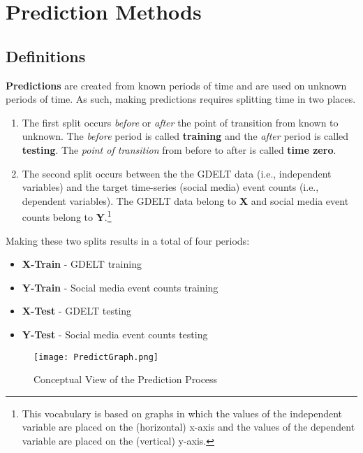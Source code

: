 
\chapter{Prediction Methods} \label{chap:PredictionMethods}

\section{Definitions}

\textbf{Predictions} are created from known periods of time and are used on unknown periods of time. 
As such, making predictions requires splitting time in two places. 

\begin{enumerate} 
  \item The first split occurs \emph{before} or \emph{after} the point of transition from known to unknown.  The \textit{before} period is called \textbf{training} and the \textit{after} period is called \textbf{testing}. The \textit{point of transition} from before to after is called \textbf{time zero}. 
  \item The second split occurs between the the GDELT data (i.e., independent variables) and the target time-series (social media) event counts (i.e., dependent variables). The GDELT data belong to \textbf{X} and social media event counts belong to \textbf{Y}.\footnote{This vocabulary is based on graphs in which the values of the independent variable are placed on the (horizontal) x-axis and the values of the dependent variable are placed on the (vertical) y-axis.} 
\end{enumerate}

\par Making these two splits results in a total of four periods:

\begin{itemize} 
\item \textbf{X-Train}	- GDELT training
\item \textbf{Y-Train}	- Social media event counts training
\item \textbf{X-Test} - GDELT testing
\item \textbf{Y-Test} - Social media event counts testing
\end{itemize}

\begin{figure}
[htbp] \texttt{[image: PredictGraph.png]}
\caption{Conceptual View of the Prediction Process} 
\label{PredictGraphFigure} 
\end{figure}

